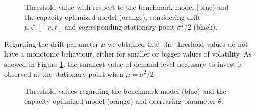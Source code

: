 \begin{figure}[!htb]
	\begin{subfigmatrix}{2}
	\end{subfigmatrix}
	\caption{Threshold value with respect to the benchmark model (blue) and the capacity optimized model (orange), considering drift $\mu \in [-r, r]$ and corresponding stationary point $\sigma^2/2$ (black).}
	\label{fig:mu}
\end{figure}

Regarding the drift parameter $\mu$ we obtained that the threshold values do not have a monotonic behaviour, either for smaller or bigger values of volatility. As showed in Figure \ref{fig:mu}, the smallest value of demand level necessary to invest is observed at the stationary point when $\mu=\sigma^2/2$.



\begin{figure}[!htb]
	\centering
	\caption{Threshold values regarding the benchmark model (blue) and the capacity optimized model (orange) and decreasing parameter $\theta$.}
	\label{fig:td}
\end{figure}


